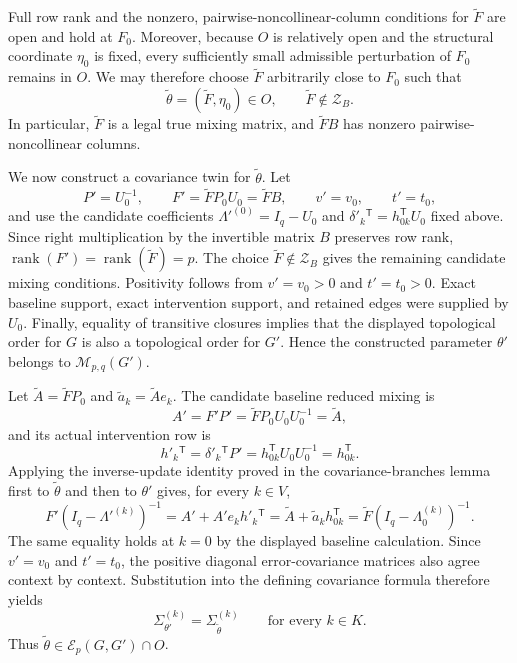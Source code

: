 Full row rank and the nonzero, pairwise-noncollinear-column conditions for \(\widetilde F\) are open and hold at \(F_0\).  Moreover, because \(O\) is relatively open and the structural coordinate \(\eta_0\) is fixed, every sufficiently small admissible perturbation of \(F_0\) remains in \(O\).  We may therefore choose \(\widetilde F\) arbitrarily close to \(F_0\) such that
\[
 \widetilde\theta=(\widetilde F,\eta_0)\in O,
 \qquad \widetilde F\notin\mathcal Z_B.
\]
In particular, \(\widetilde F\) is a legal true mixing matrix, and \(\widetilde F B\) has nonzero pairwise-noncollinear columns.

We now construct a covariance twin for \(\widetilde\theta\).  Let
\[
 P'=U_0^{-1},\qquad
 F'=\widetilde F P_0U_0=\widetilde F B,
 \qquad v'=v_0,\qquad t'=t_0,
\]
and use the candidate coefficients \(\Lambda'^{(0)}=I_q-U_0\) and \(\delta'_k{}^{\mathsf T}=h_{0k}^{\mathsf T}U_0\) fixed above.  Since right multiplication by the invertible matrix \(B\) preserves row rank,
\(
 \operatorname{rank}(F')=\operatorname{rank}(\widetilde F)=p.
\)
The choice \(\widetilde F\notin\mathcal Z_B\) gives the remaining candidate mixing conditions.  Positivity follows from \(v'=v_0>0\) and \(t'=t_0>0\).  Exact baseline support, exact intervention support, and retained edges were supplied by \(U_0\).  Finally, equality of transitive closures implies that the displayed topological order for \(G\) is also a topological order for \(G'\).  Hence the constructed parameter \(\theta'\) belongs to \(\mathcal M_{p,q}(G')\).

Let \(\widetilde A=\widetilde F P_0\) and \(\widetilde a_k=\widetilde A e_k\).  The candidate baseline reduced mixing is
\[
 A'=F'P'=\widetilde F P_0U_0U_0^{-1}=\widetilde A,
\]
and its actual intervention row is
\[
 h'_k{}^{\mathsf T}
 =\delta'_k{}^{\mathsf T}P'
 =h_{0k}^{\mathsf T}U_0U_0^{-1}
 =h_{0k}^{\mathsf T}.
\]
Applying the inverse-update identity proved in the covariance-branches lemma first to \(\widetilde\theta\) and then to \(\theta'\) gives, for every \(k\in V\),
\[
 F'(I_q-\Lambda'^{(k)})^{-1}
 =A'+A'e_kh'_k{}^{\mathsf T}
 =\widetilde A+\widetilde a_kh_{0k}^{\mathsf T}
 =\widetilde F(I_q-\Lambda^{(k)}_0)^{-1}.
\]
The same equality holds at \(k=0\) by the displayed baseline calculation.  Since \(v'=v_0\) and \(t'=t_0\), the positive diagonal error-covariance matrices also agree context by context.  Substitution into the defining covariance formula therefore yields
\[
 \Sigma_{\theta'}^{(k)}=\Sigma_{\widetilde\theta}^{(k)}
 \qquad\text{for every }k\in K.
\]
Thus \(\widetilde\theta\in\mathcal E_p(G,G')\cap O\).

